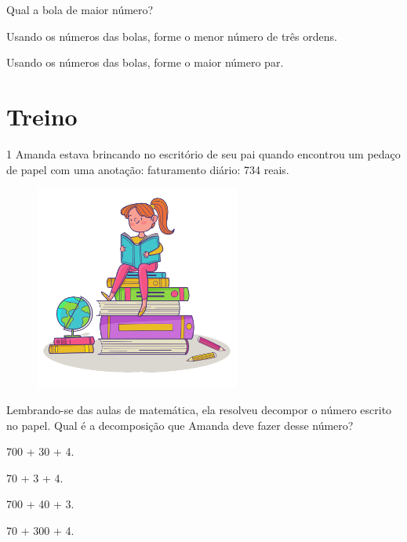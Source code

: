 \begin{escolha}
\item Qual a bola de maior número?

\item Usando os números das bolas, forme o menor número de três ordens. 

\item Usando os números das bolas, forme o maior número par.

\end{escolha}


\pagebreak

\section*{Treino}

\num{1} Amanda estava brincando no escritório de seu pai quando
encontrou um pedaço de papel com uma anotação: faturamento diário: 734 reais.

\begin{figure}[htpb!]
\centering
\includegraphics[width=0.6\textwidth]{./media/image6b.png}
\end{figure}

Lembrando-se das aulas de matemática, ela resolveu decompor o número escrito
no papel. Qual é a decomposição que Amanda deve fazer desse
número?

\begin{escolha}
\item
  700 + 30 + 4.
\item
  70 + 3 + 4.
\item
  700 + 40 + 3.
\item
  70 + 300 + 4.
\end{escolha}

